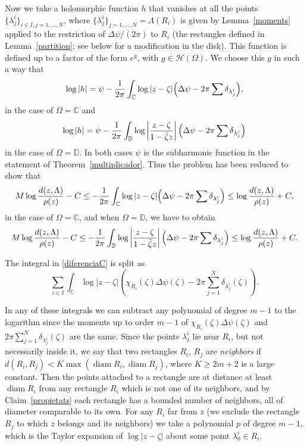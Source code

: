 \documentclass[12pt,twoside,final,psamsfonts]{amsart}
\theoremstyle{plain}
\theoremstyle{remark}
\theoremstyle{definition}
\newcommand{\C}{{\mathbb C}}
\newcommand{\D}{{\mathbb D}}
\renewcommand{\H}{{\mathcal H}}
\begin{document}
Now we take a holomorphic function $h$ that vanishes at all the points 
$\{\lambda_j^i\}_{i\in I,j=1,\ldots,N}$, where
$\{\lambda_j^i\}_{j=1,\ldots,N}=\Lambda(R_i)$ is given by Lemma~\ref{moments}
applied to the restriction of $\Delta\psi/(2\pi)$ to $R_i$ (the rectangles defined
in Lemma~\ref{partition}; see below for a modification in the disk).
This function is defined up to a
factor of
the form $e^g$, with $g\in \H(\Omega)$. We choose this $g$ in such a way that
\[
\log|h|= \psi - \frac 1{2\pi} \int_{\C}
\log|z-\zeta| \Bigl(\Delta\psi-2\pi\sum \delta_{\lambda_j^i}\Bigr),
\]
in the case of $\Omega=\C$ and
\[
\log|h|=\psi -\frac 1{2\pi}
\int_{\D} \log\left|\frac{z-\zeta}{1-\bar\zeta z}\right|
\Bigl(\Delta\psi-2\pi\sum \delta_{\lambda_j^i}\Bigr)
\]
in the case of $\Omega=\D$. In both cases $\psi$ is the subharmonic function in
the statement of Theorem~\ref{multiplicador}.
Thus the problem has been reduced to show that
\begin{equation}\label{diferenciaC}
M\log{\frac{d(z,\Lambda)}{\rho(z)}}-C\le
-\frac 1{2\pi}\int_{\C} \log|z-\zeta| \Bigl(\Delta\psi-2\pi\sum \delta_{\lambda_j^i}\Bigr)\le
\log{\frac{d(z,\Lambda)}{\rho(z)}}+C,
\end{equation}
in the case of $\Omega=\C$, and  when $\Omega=\D$, we have to obtain
\begin{equation}\label{diferenciaD}
M\log{\frac{d(z,\Lambda)}{\rho(z)}}-C\le
-\frac 1{2\pi}\int_{\D} \log\left|\frac{z-\zeta}{1-\bar\zeta z}\right|
\Bigl(\Delta\psi-2\pi\sum \delta_{\lambda_j^i}\Bigr)\le
\log{\frac{d(z,\Lambda)}{\rho(z)}}+C.
\end{equation}

The integral in \eqref{diferenciaC} is split as
\[
\sum_{i\in I}\int_{\C} \log |z-\zeta|
\left(\chi_{R_i}(\zeta)\Delta\psi(\zeta)-2\pi\sum_{j=1}^N
\delta_{\lambda_j^i}(\zeta)\right).
\]

In any of these integrals we can subtract any polynomial of degree $m-1$ to the
logarithm since the moments up to order $m-1$ of
$\chi_{R_i}(\zeta)\Delta\psi(\zeta)$ and $2\pi\sum_{j=1}^N  \delta_{\lambda_j^i}
(\zeta)$
are the same. Since the points $\lambda^i_j$ lie near $R_i$, but not
necessarily inside it, we say that two rectangles $R_i$, $R_j$ are
\emph{neighbors} if $d(R_i,R_j)<K\max(\operatorname{diam}R_i,\operatorname{diam}R_j)$,
where $K\ge 2m+2$ is a large constant. Then the points attached to a rectangle
are at distance at least $\operatorname{diam}R_i$ from any rectangle $R_i$ which is
not one of its neighbors, and by Claim~\ref{propietats} each rectangle has a
bounded number of neighbors, all of diameter comparable to its own.
For any $R_i$ far from $z$ (we exclude the rectangle  $R_j$ to
which $z$ belongs and its neighbors) we take a polynomial
$p$  of degree
$m-1$, which is the Taylor expansion of $\log|z-\zeta|$ about some point 
$\lambda_0^i\in R_i$.
\end{document}
